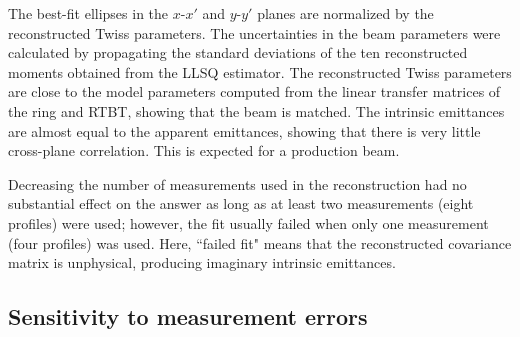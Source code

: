 %
The best-fit ellipses in the $x$-$x'$ and $y$-$y'$ planes are normalized by the reconstructed Twiss parameters. The uncertainties in the beam parameters were calculated by propagating the standard deviations of the ten reconstructed moments obtained from the LLSQ estimator. The reconstructed Twiss parameters are close to the model parameters computed from the linear transfer matrices of the ring and RTBT, showing that the beam is matched. The intrinsic emittances are almost equal to the apparent emittances, showing that there is very little cross-plane correlation. This is expected for a production beam.

Decreasing the number of measurements used in the reconstruction had no substantial effect on the answer as long as at least two measurements (eight profiles) were used; however, the fit usually failed when only one measurement (four profiles) was used. Here, ``failed fit" means that the reconstructed covariance matrix is unphysical, producing imaginary intrinsic emittances. 



\subsection{Sensitivity to measurement errors}

